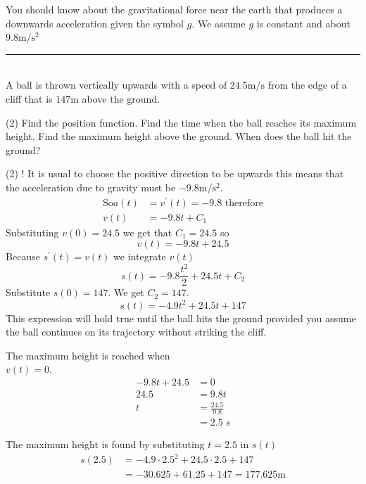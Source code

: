You should know about the gravitational force near the earth that produces a downwards acceleration
given the symbol $g$. We assume $g$ is constant and about $9.8 \mbox{m}$/$\mathrm{s}^{2}$ \\
\rule{6.8cm}{0.5pt}\\
\example A ball is thrown vertically upwards with a speed of $24.5 \mbox{m}$/$\mbox{s}$ from the edge of a cliff that is $147 \mbox{m}$ above the ground. 
\begin{tasks}(2)
\task Find the position function. 
\task Find the time when the ball reaches its maximum height. 
\task Find the maximum height above the ground. 
\task When does the ball hit the ground? \end{tasks}

\solution
\begin{tasks}(2)
	\task! It is usual to choose the positive direction
to be upwards this means that the acceleration due to gravity must be $ -9.8 \mbox{m}$/$\mathrm{s}^{2}$.
\begin{align*}\text{So}a (t) &  = v^{ \prime } (t) = -9.8\text{ therefore} \\
v (t) &  =  -9.8 t +C_{1}\end{align*}
Substituting $v (0) =24.5$ we get that $C_{1} =24.5$ so
\begin{equation*}v (t) = -9.8 t +24.5
\end{equation*}
Because $s^{ \prime } (t) =v (t)$ we integrate $v (t)$
\begin{equation*}s (t) = -9.8 \frac{t^{2}}{2} +24.5 t +C_{2}
\end{equation*}
Substitute $s (0) =147$. We get $C_{2} =147$.
\begin{equation*}s(t) = -4.9 t^{2} +24.5 t +147
\end{equation*}
This expression will hold true until the ball hits the ground provided you assume the ball continues on its trajectory without striking the cliff. 

\task The maximum height is reached when\\ $v (t) =0$.
\begin{align*} -9.8 t +24.5 &  = 0 \\
24.5 &  = 9.8 t \\
t &  = \frac{24.5}{9.8} \\
 &  = 2.5\text{ s}\end{align*}

\task The maximum height is found by substituting
$t =2.5$ in $s (t)$
\begin{align*}s (2.5) &  =  -4.9 \cdot 2.5^{2} +24.5 \cdot 2.5 +147 \\
 &  =  -30.625 +61.25 +147 =177.625 \mbox{m}\end{align*}


\end{tasks}
